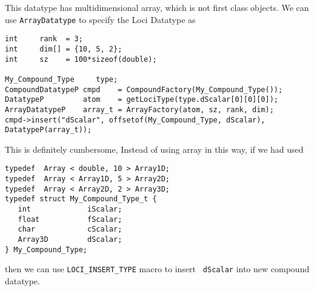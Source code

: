 %
This datatype has multidimensional array, which is not first class
objects. We can use {\tt ArrayDatatype} to specify the Loci Datatype as
\begin{verbatim}
int     rank  = 3;
int     dim[] = {10, 5, 2};
int     sz    = 100*sizeof(double);

My_Compound_Type     type;
CompoundDatatypeP cmpd    = CompoundFactory(My_Compound_Type());
DatatypeP         atom    = getLociType(type.dScalar[0][0][0]);
ArrayDatatypeP    array_t = ArrayFactory(atom, sz, rank, dim);
cmpd->insert("dScalar", offsetof(My_Compound_Type, dScalar), DatatypeP(array_t));
\end{verbatim}

This is definitely cumbersome, Instead of using array in this way, if
we had used
\begin{verbatim}
typedef  Array < double, 10 > Array1D;
typedef  Array < Array1D, 5 > Array2D;
typedef  Array < Array2D, 2 > Array3D;
typedef struct My_Compound_Type_t {
   int             iScalar;
   float           fScalar;
   char            cScalar;
   Array3D         dScalar;
} My_Compound_Type;
\end{verbatim}
then we can use {\tt LOCI\_INSERT\_TYPE} macro to insert {\tt
dScalar} into new compound datatype.

%
